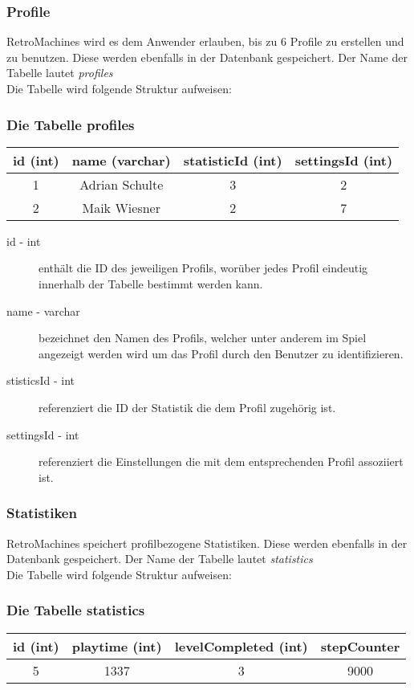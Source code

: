 \subsubsection{Profile}

RetroMachines wird es dem Anwender erlauben, bis zu 6 Profile zu erstellen und zu benutzen. Diese werden ebenfalls in der Datenbank gespeichert. Der Name der Tabelle lautet \textit{profiles}\\
Die Tabelle wird folgende Struktur aufweisen:

{\center
\subsubsection*{Die Tabelle profiles}
\begin{tabular}{cccc}
	\hline
	id (int) & name (varchar) & statisticId (int) & settingsId (int) \\
	\hline
	1 & Adrian Schulte & 3 & 2 \\
	2 & Maik Wiesner & 2 & 7 \\
	\hline
\end{tabular}
\par
}

\begin{description}
	\item[id - int] enthält die ID des jeweiligen Profils, worüber jedes Profil eindeutig innerhalb der Tabelle bestimmt werden kann.
	\item[name - varchar] bezeichnet den Namen des Profils, welcher unter anderem im Spiel angezeigt werden wird um das Profil durch den Benutzer zu identifizieren.
	\item[stisticsId - int] referenziert die ID der Statistik die dem Profil zugehörig ist.
	\item[settingsId - int] referenziert die Einstellungen die mit dem entsprechenden Profil assoziiert ist.
\end{description}


\subsubsection{Statistiken}

RetroMachines speichert profilbezogene Statistiken. Diese werden ebenfalls in der Datenbank gespeichert. Der Name der Tabelle lautet \textit{statistics}\\
Die Tabelle wird folgende Struktur aufweisen:

{\center
\subsubsection*{Die Tabelle statistics}
\begin{tabular}{cccc}
	\hline
	id (int) & playtime (int) & levelCompleted (int) & stepCounter \\
	\hline
	5 & 1337 & 3 & 9000 \\
	\hline
\end{tabular}
\par
}


